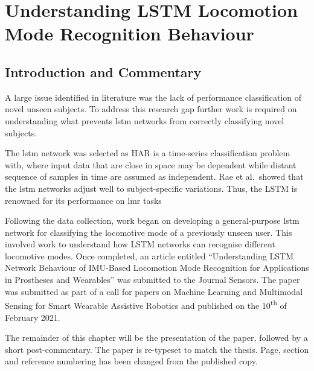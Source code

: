\chapter{Understanding LSTM Locomotion Mode Recognition Behaviour}
\label{chp:lstm-general}

\section{Introduction and Commentary}
A large issue identified in literature was the lack of performance classification of novel unseen subjects. To address this research gap further work is required on understanding what prevents \acrshort{lstm} networks from correctly classifying novel subjects.

The \acrshort{lstm} network was selected as HAR is a time-series classification problem with, where input data that are close in space may be dependent while distant sequence of samples in time are assumed as independent. Rae et al.~showed that the \acrshort{lstm} networks adjust well to subject-specific variations\cite{Rai2019}. Thus, the LSTM is renowned for its performance on \acrshort{lmr} tasks\cite{Ordonez2016, Cheng2019, Pienaar2019} 

Following the data collection, work began on developing a general-purpose \acrfull{lstm} network for classifying the locomotive mode of a previously unseen user. This involved work to understand how LSTM networks can recognise different locomotive modes. Once completed, an article entitled ``Understanding LSTM Network Behaviour of IMU-Based Locomotion Mode Recognition for Applications in Prostheses and Wearables'' was submitted to the Journal Sensors. The paper was submitted as part of a call for papers on Machine Learning and Multimodal Sensing for Smart Wearable Assistive Robotics and published on the 10\textsuperscript{th} of February 2021.

The remainder of this chapter will be the presentation of the paper, followed by a short post-commentary. The paper is re-typeset to match the thesis. Page, section and reference numbering has been changed from the published copy.



